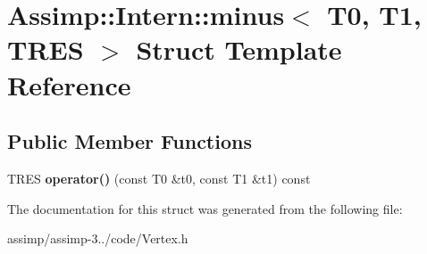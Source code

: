 \hypertarget{struct_assimp_1_1_intern_1_1minus}{\section{Assimp\+:\+:Intern\+:\+:minus$<$ T0, T1, T\+R\+E\+S $>$ Struct Template Reference}
\label{struct_assimp_1_1_intern_1_1minus}
}
\subsection*{Public Member Functions}
\begin{DoxyCompactItemize}
\item 
\hypertarget{struct_assimp_1_1_intern_1_1minus_ad0fa7607ce6107df979b6d360d0be6c4}{T\+R\+E\+S {\bfseries operator()} (const T0 \&t0, const T1 \&t1) const }\label{struct_assimp_1_1_intern_1_1minus_ad0fa7607ce6107df979b6d360d0be6c4}

\end{DoxyCompactItemize}


The documentation for this struct was generated from the following file\+:\begin{DoxyCompactItemize}
\item 
assimp/assimp-\/3../code/Vertex.\+h\end{DoxyCompactItemize}
